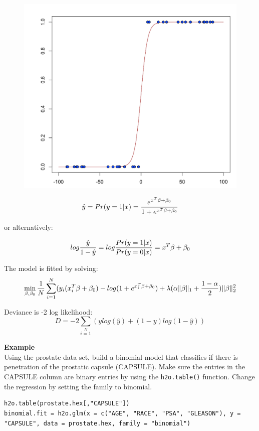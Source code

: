 \documentclass[11pt]{article}
\begin{document}
\begin{figure}[h]
\centering
\includegraphics[scale=0.5]{scurve.png}
\end{figure}


 

\[ \hat{y} = Pr(y = 1|x) = {e^{x^T\beta + \beta_0} \over 1 + e^{x^T \beta + \beta_0} } \]

or alternatively:


\[log {\hat{y} \over 1- \hat{y}} = log{Pr(y=1|x) \over Pr(y=0|x)} = x^T \beta + \beta_0\]

The model is fitted by solving:
\[  \min\limits_{\beta,\beta_0} { {1 \over N}\sum\limits_{i=1}\limits^{N}(y_i (x_i^{T}\beta  + \beta_0) - log (1 + e^{x_i^{T}\beta  + \beta_0} )  + \lambda (\alpha \|\beta \|_1 + {1-\alpha \over 2}) \| \beta \|_2^2} \]

Deviance is -2 log likelihood:
\[D = -2\sum\limits_{i=1}\limits^{N}{(y log(\hat{y}) + (1 - y)log(1-\hat{y})  )}\]

\textbf{Example}\\

Using the prostate data set, build a binomial model that classifies if there is penetration of the prostatic capsule (CAPSULE). Make sure the entries in the CAPSULE column are binary entries by using the \texttt{h2o.table()} function. Change the regression by setting the family to binomial.
\begin{lstlisting}[style=R]
h2o.table(prostate.hex[,"CAPSULE"])
binomial.fit = h2o.glm(x = c("AGE", "RACE", "PSA", "GLEASON"), y = "CAPSULE", data = prostate.hex, family = "binomial")
\end{lstlisting}
\end{document}
